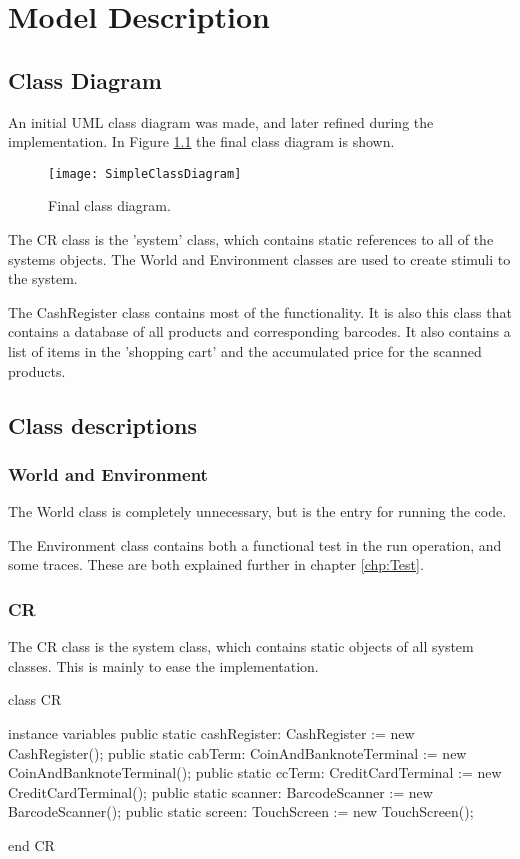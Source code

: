 \chapter{Model Description}

\section{Class Diagram}
An initial UML class diagram was made, and later refined during the implementation. 
In Figure \ref{fig:SimpleClassDiagram} the final class diagram is shown.

\begin{figure}[H]
\centering
\texttt{[image: SimpleClassDiagram]}
\caption{Final class diagram.}
\label{fig:SimpleClassDiagram}
\end{figure}

The CR class is the 'system' class, which contains static references to all of the systems objects. 
The World and Environment classes are used to create stimuli to the system.

The CashRegister class contains most of the functionality. It is also this class that contains a database of all products and corresponding barcodes. 
It also contains a list of items in the 'shopping cart' and the accumulated price for the scanned products.

\newpage
\section{Class descriptions}

\subsection{World and Environment}
The World class is completely unnecessary, but is the entry for running the code.

The Environment class contains both a functional test in the run operation, and some traces. These are both explained further in chapter \ref{chp:Test}.

\subsection{CR}
The CR class is the system class, which contains static objects of all system classes. This is mainly to ease the implementation.
\begin{vdmpp}
class CR
 
instance variables
 public static cashRegister: CashRegister := new CashRegister(); 
 public static cabTerm: CoinAndBanknoteTerminal := new CoinAndBanknoteTerminal();
 public static ccTerm: CreditCardTerminal := new CreditCardTerminal();
 public static scanner: BarcodeScanner := new BarcodeScanner();
 public static screen: TouchScreen := new TouchScreen(); 
  
end CR
\end{vdmpp}

